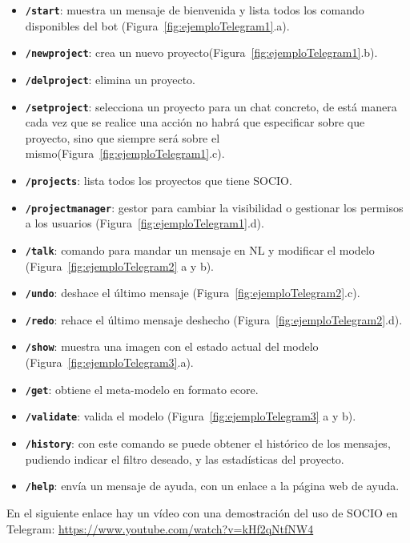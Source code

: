 \begin{itemize}
\item \textbf{\texttt{/start}}: muestra un mensaje de bienvenida y lista todos los comando disponibles del bot (Figura~\ref{fig:ejemploTelegram1}.a).
\item \textbf{\texttt{/newproject}}: crea un nuevo proyecto(Figura~\ref{fig:ejemploTelegram1}.b).
\item \textbf{\texttt{/delproject}}: elimina un proyecto.
\item \textbf{\texttt{/setproject}}: selecciona un proyecto para un chat concreto, de está manera cada vez que se realice una acción no habrá que especificar sobre que proyecto, sino que siempre será sobre el mismo(Figura~\ref{fig:ejemploTelegram1}.c).
\item \textbf{\texttt{/projects}}: lista todos los proyectos que tiene SOCIO.
\item \textbf{\texttt{/projectmanager}}:  gestor para cambiar la visibilidad o gestionar los permisos a los usuarios (Figura~\ref{fig:ejemploTelegram1}.d).
\item \textbf{\texttt{/talk}}: comando para mandar un mensaje en NL y modificar el modelo (Figura~\ref{fig:ejemploTelegram2} a y b).
\item \textbf{\texttt{/undo}}: deshace el último mensaje (Figura~\ref{fig:ejemploTelegram2}.c).
\item \textbf{\texttt{/redo}}: rehace el último mensaje deshecho (Figura~\ref{fig:ejemploTelegram2}.d).
\item \textbf{\texttt{/show}}: muestra una imagen con el estado actual del modelo (Figura~\ref{fig:ejemploTelegram3}.a).
\item \textbf{\texttt{/get}}: obtiene el meta-modelo en formato ecore. 
\item \textbf{\texttt{/validate}}: valida el modelo (Figura~\ref{fig:ejemploTelegram3} a y b).
\item \textbf{\texttt{/history}}: con este comando se puede obtener el histórico de los mensajes, pudiendo indicar el filtro deseado, y las estadísticas del proyecto.
\item \textbf{\texttt{/help}}: envía un mensaje de ayuda, con un enlace a la página web de ayuda.
\end{itemize}

En el siguiente enlace hay un vídeo con una demostración del uso de SOCIO en Telegram: 
\url{https://www.youtube.com/watch?v=kHf2qNtfNW4}


